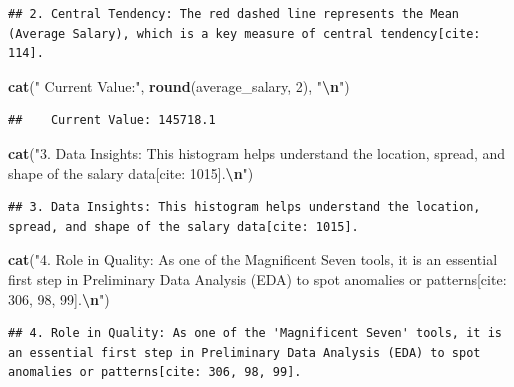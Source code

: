 \documentclass[
]{article}
\newenvironment{Shaded}{\begin{snugshade}}{\end{snugshade}}
\newcommand{\DecValTok}[1]{\textcolor[rgb]{0.00,0.00,0.81}{#1}}
\newcommand{\FunctionTok}[1]{\textcolor[rgb]{0.13,0.29,0.53}{\textbf{#1}}}
\newcommand{\NormalTok}[1]{#1}
\newcommand{\SpecialCharTok}[1]{\textcolor[rgb]{0.81,0.36,0.00}{\textbf{#1}}}
\newcommand{\StringTok}[1]{\textcolor[rgb]{0.31,0.60,0.02}{#1}}
\begin{document}
\begin{verbatim}
## 2. Central Tendency: The red dashed line represents the Mean (Average Salary), which is a key measure of central tendency[cite: 114].
\end{verbatim}

\begin{Shaded}
\begin{Highlighting}[]
\FunctionTok{cat}\NormalTok{(}\StringTok{"   Current Value:"}\NormalTok{, }\FunctionTok{round}\NormalTok{(average\_salary, }\DecValTok{2}\NormalTok{), }\StringTok{"}\SpecialCharTok{\textbackslash{}n}\StringTok{"}\NormalTok{)}
\end{Highlighting}
\end{Shaded}

\begin{verbatim}
##    Current Value: 145718.1
\end{verbatim}

\begin{Shaded}
\begin{Highlighting}[]
\FunctionTok{cat}\NormalTok{(}\StringTok{"3. Data Insights: This histogram helps understand the location, spread, and shape of the salary data[cite: 1015].}\SpecialCharTok{\textbackslash{}n}\StringTok{"}\NormalTok{)}
\end{Highlighting}
\end{Shaded}

\begin{verbatim}
## 3. Data Insights: This histogram helps understand the location, spread, and shape of the salary data[cite: 1015].
\end{verbatim}

\begin{Shaded}
\begin{Highlighting}[]
\FunctionTok{cat}\NormalTok{(}\StringTok{"4. Role in Quality: As one of the \textquotesingle{}Magnificent Seven\textquotesingle{} tools, it is an essential first step in Preliminary Data Analysis (EDA) to spot anomalies or patterns[cite: 306, 98, 99].}\SpecialCharTok{\textbackslash{}n}\StringTok{"}\NormalTok{)}
\end{Highlighting}
\end{Shaded}

\begin{verbatim}
## 4. Role in Quality: As one of the 'Magnificent Seven' tools, it is an essential first step in Preliminary Data Analysis (EDA) to spot anomalies or patterns[cite: 306, 98, 99].
\end{verbatim}
\end{document}
